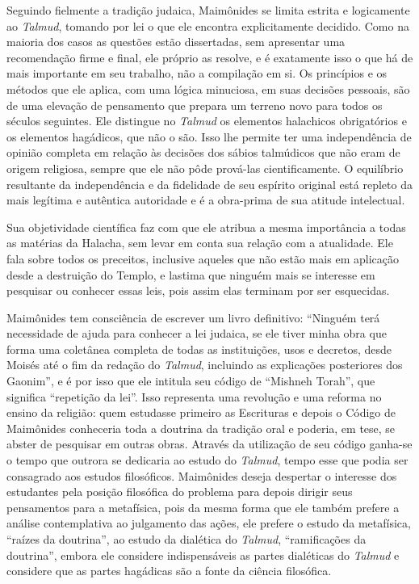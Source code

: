 Seguindo fielmente a tradição judaica, Maimônides se limita estrita e
logicamente ao \emph{Talmud}, tomando por lei o que ele encontra
explicitamente decidido. Como na maioria dos casos as questões estão
dissertadas, sem apresentar uma recomendação firme e final, ele próprio
as resolve, e é exatamente isso o que há de mais importante em seu
trabalho, não a compilação em si. Os princípios e os métodos que ele
aplica, com uma lógica minuciosa, em suas decisões pessoais, são de uma
elevação de pensamento que prepara um terreno novo para todos os séculos
seguintes. Ele distingue no \emph{Talmud} os elementos halachicos
obrigatórios e os elementos hagádicos, que não o são. Isso lhe permite
ter uma independência de opinião completa em relação às decisões dos
sábios talmúdicos que não eram de origem religiosa, sempre que ele não
pôde prová-las cientificamente. O equilíbrio resultante da independência
e da fidelidade de seu espírito original está repleto da mais legítima
e autêntica autoridade e é a obra-prima de sua atitude intelectual.

Sua objetividade científica faz com que ele atribua a mesma importância
a todas as matérias da Halacha, sem levar em conta sua relação com a
atualidade. Ele fala sobre todos os preceitos, inclusive aqueles que não
estão mais em aplicação desde a destruição do Templo, e lastima que
ninguém mais se interesse em pesquisar ou conhecer essas leis, pois
assim elas terminam por ser esquecidas.

Maimônides tem consciência de escrever um livro definitivo: ``Ninguém
terá necessidade de ajuda para conhecer a lei judaica, se ele tiver
minha obra que forma uma coletânea completa de todas as instituições,
usos e decretos, desde Moisés até o fim da redação do \emph{Talmud},
incluindo as explicações posteriores dos Gaonim'', e é por isso que ele
intitula seu código de ``Mishneh Torah'', que significa ``repetição da
lei''. Isso representa uma revolução e uma reforma no ensino da
religião: quem estudasse primeiro as Escrituras e depois o Código de
Maimônides conheceria toda a doutrina da tradição oral e poderia, em
tese, se abster de pesquisar em outras obras. Através da utilização de
seu código ganha-se o tempo que outrora se dedicaria ao estudo do
\emph{Talmud}, tempo esse que podia ser consagrado aos estudos
filosóficos. Maimônides deseja despertar o interesse dos estudantes pela
posição filosófica do problema para depois dirigir seus pensamentos para
a metafísica, pois da mesma forma que ele também prefere a análise
contemplativa ao julgamento das ações, ele prefere o estudo da
metafísica, ``raízes da doutrina'', ao estudo da dialética do
\emph{Talmud}, ``ramificações da doutrina'', embora ele considere
indispensáveis as partes dialéticas do \emph{Talmud} e considere que as
partes hagádicas são a fonte da ciência filosófica.


